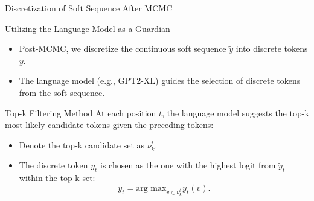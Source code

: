 \documentclass{beamer}
\begin{document}
\begin{frame}{Discretization of Soft Sequence After MCMC}
    \begin{block}{Utilizing the Language Model as a Guardian}
        \begin{itemize}
            \item Post-MCMC, we discretize the continuous soft sequence \(\tilde{y}\) into discrete tokens \(y\).
            \item The language model (e.g., GPT2-XL) guides the selection of discrete tokens from the soft sequence.
        \end{itemize}
    \end{block}

    \begin{block}{Top-k Filtering Method}
        At each position \(t\), the language model suggests the top-k most likely candidate tokens given the preceding tokens:
        \begin{itemize}
            \item Denote the top-k candidate set as \(\nu_k^t\).
            \item The discrete token \(y_t\) is chosen as the one with the highest logit from \(\tilde{y}_t\) within the top-k set:
                  \begin{equation}
                      y_t = \text{arg max}_{v \in \nu_k^t} \tilde{y}_t(v).
                  \end{equation}
        \end{itemize}
    \end{block}

\end{frame}
\end{document}
